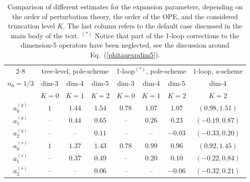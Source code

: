 \documentclass[a4paper,11pt]{article}
\begin{document}
\begin{table}[t!p]
\begin{center} \small 
	\begin{tabular}{c | ccc | ccc || c |}
		\cline{2-8}
 & \multicolumn{3}{c|}{tree-level, pole-scheme} & \multicolumn{3}{c||}{1-loop$^{(*)}$, pole-scheme} & 1-loop, $a$-scheme 
 \\
 $n_0=1/3$ & dim-3 & dim-4 & dim-5 & dim-3 & dim-4 & dim-5 & dim-4
 \\
 & $K=0$ & $K=1$ & $K=2$ & $K=0$ & $K=1$ & $K=2$ & $K=2$
 \\
 \hline \hline 
 \multicolumn{1}{|c|}{$a_0^{(q)}$} & $1$ & $1.44$ & $1.54$ & $0.78$ & $1.07$ & $1.07$ & $(0.98, 1.51)$
 \\
\multicolumn{1}{|c|}{$a_1^{(q)}$} & -- & $0.44$ & $0.65$ & -- & $0.26$ & $0.23$ & $(-0.19, 0.87)$
 \\
 \multicolumn{1}{|c|}{$a_2^{(q)}$} & -- & -- & $0.11$ & -- & -- & $-0.03$ & $(-0.33, 0.20)$
 \\
 \hline 
 \multicolumn{1}{|c|}{$a_0^{(s)}$ }& $1$ & $1.37$ & $1.43$  &  $0.78$ &  $0.99$ &  $0.96$ & $(0.92, 1.45)$
 \\ 
\multicolumn{1}{|c|}{ $a_1^{(s)}$ }&	-- & $0.37$ & $0.49$ & -- & $0.20$ & $0.10$ & $(-0.22, 0.84)$
 \\
\multicolumn{1}{|c|}{ $a_2^{(s)}$}& -- & -- & $0.06$ & -- & -- & $-0.06$ & $(-0.32, 0.21)$
 \\
 \hline
	\end{tabular}
\end{center}
\caption{\label{tab:comp-dim-5} 
	Comparison of different estimates for the expansion parameters, depending on the order of perturbation theory,
 the order of the OPE, and the considered truncation level $K$. The last column refers to the default case discussed in the main body of the text. ${}^{(*)}$ Notice that 
 part of the 1-loop corrections to the dimension-5 operators have been neglected, see the discussion around Eq.~(\ref{phitauexpdim5}).}
\end{table}
\end{document}
